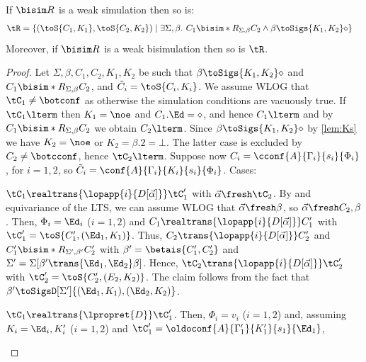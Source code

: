 \paragraph{}
  If $\bisim R$ is a weak simulation then so is:
  \begin{align*}
     \tR = \{
           (\toS{C_1,K_1},\toS{C_2,K_2}) \mid&\; %
                                                         \exists\Sigma,\beta.\
  C_1\bisim*{R}_{\Sigma,\beta}C_2
\land
                                                         \beta\toSigs{K_1,K_2}\diamond
\}
  \end{align*}
  Moreover, if $\bisim R$ is a weak bisimulation then so is $\tR$.
%
\begin{proof}%
  Let $\Sigma,\beta,C_1,C_2,K_1,K_2$ be such that
  $\beta\toSigs{K_1,K_2}\diamond$
and
$C_1\bisim*{R}_{\Sigma,\beta}C_2$, and $\tilde C_i=\toS{C_i,K_i}$. We assume WLOG that $\tC_1\neq\botconf$ as otherwise the simulation conditions are vacuously true. If $\tC_1\lterm$ then $K_1=\noe$ and $C_1.\Ed=\diamond$, and hence $C_1\lterm$ and by 
$  C_1\bisim*{R}_{\Sigma,\beta}C_2$
we obtain $C_2\lterm$. 
Since   $\beta\toSigs{K_1,K_2}\diamond$
 by \cref{lem:Ks}
we have $K_2=\noe$ or $K_2=\beta.2=\bot$. The latter case is excluded by $C_2\neq\botcconf$, hence $\tC_2\lterm$.
%
Suppose now
$C_i=\cconf{A}{\Gamma_i}{s_i}{\Phi_i}$, for $i=1,2$,
so
 $\tilde C_i=\conf{A}{\Gamma_i}{K_i}{s_i}{\Phi_i}$. Cases:
\begin{asparaitem}
\item $\tC_1\realtrans{\lopapp{i}{D[\vec\alpha]}}\tC_1'$ with $\vec\alpha\fresh\tC_2$. By  and equivariance of the LTS, we can assume WLOG that $\vec\alpha\fresh\beta$, so $\vec\alpha\fresh C_2,\beta$.
  Then, $\Phi_i=\Ed_i$ ($i=1,2$) and 
  $C_1\realtrans{\lopapp{i}{D[\vec\alpha]}}C_1'$ with $\tC_1'=\toS{C_1',(\Ed_1,K_1)}$. Thus,
    $C_2\trans{\lopapp{i}{D[\vec\alpha]}}C_2'$ and $C_1'\bisim*{R}_{\Sigma',\beta'}C_2'$ with $\beta'=\betais{C_1',C_2'}$ and $\Sigma'=\Sigma[\beta'\trans{\Ed_1,\Ed_2}\beta]$.
Hence, $\tC_2\trans{\lopapp{i}{D[\vec\alpha]}}\tC_2'$ with $\tC_2'=\toS{C_2',(E_2,K_2)}$. The claim follows from the fact that $\beta'\toSigsD[\Sigma']{(\Ed_1,K_1),(\Ed_2,K_2)}$.
\item $\tC_1\realtrans{\lpropret{D}}\tC_1'$.
Then, $\Phi_i=v_i$ ($i=1,2$) and, assuming $K_i=\Ed_i,K_i'$ ($i=1,2$) and $\tC_1'=\oldoconf{A}{\Gamma_1'}{K_1'}{s_1}{\Ed_1}$,

\end{asparaitem}
\end{proof}
